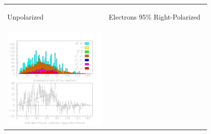 \documentclass[12pt]{article}
\begin{document}
\begin{figure}[t]
  \begin{center}
    \begin{tabular}{p{0.49\linewidth} p{0.49\linewidth}}
      \begin{center} Unpolarized \end{center} &
      \begin{center} Electrons 95\% Right-Polarized \end{center} \\
      \begin{minipage}{\linewidth} \vspace{-1.2 cm} \includegraphics[width=\linewidth]{../pretty_plots/two_leptons_fixed_2.pdf} \end{minipage} &

\end{tabular}
\end{center}
\end{figure}
\end{document}
